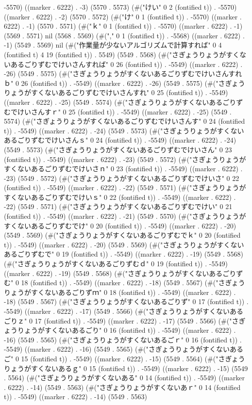 {-5570) ((marker . 6222) . -3) (5570 . 5573) (#("けい" 0 2 (fontified t)) . -5570) ((marker . 6222) . -2) (5570 . 5572) (#("け" 0 1 (fontified t)) . -5570) ((marker . 6222) . -1) (5570 . 5571) (#("ｋ" 0 1 (fontified t)) . -5570) ((marker . 6222) . -1) (5569 . 5571) nil (5568 . 5569) (#("," 0 1 (fontified t)) . -5568) ((marker . 6222) . -1) (5549 . 5569) nil (#("作業量が少ないアルゴリズムで計算すれば" 0 4 (fontified t) 4 19 (fontified t)) . 5549) (5549 . 5568) (#("さぎょうりょうがすくないあるごりずむでけいさんすれば" 0 26 (fontified t)) . -5549) ((marker . 6222) . -26) (5549 . 5575) (#("さぎょうりょうがすくないあるごりずむでけいさんすれｂ" 0 26 (fontified t)) . -5549) ((marker . 6222) . -26) (5549 . 5575) (#("さぎょうりょうがすくないあるごりずむでけいさんすれ" 0 25 (fontified t)) . -5549) ((marker . 6222) . -25) (5549 . 5574) (#("さぎょうりょうがすくないあるごりずむでけいさんすｒ" 0 25 (fontified t)) . -5549) ((marker . 6222) . -25) (5549 . 5574) (#("さぎょうりょうがすくないあるごりずむでけいさんす" 0 24 (fontified t)) . -5549) ((marker . 6222) . -24) (5549 . 5573) (#("さぎょうりょうがすくないあるごりずむでけいさんｓ" 0 24 (fontified t)) . -5549) ((marker . 6222) . -24) (5549 . 5573) (#("さぎょうりょうがすくないあるごりずむでけいさん" 0 23 (fontified t)) . -5549) ((marker . 6222) . -23) (5549 . 5572) (#("さぎょうりょうがすくないあるごりずむでけいさｎ" 0 23 (fontified t)) . -5549) ((marker . 6222) . -23) (5549 . 5572) (#("さぎょうりょうがすくないあるごりずむでけいさ" 0 22 (fontified t)) . -5549) ((marker . 6222) . -22) (5549 . 5571) (#("さぎょうりょうがすくないあるごりずむでけいｓ" 0 22 (fontified t)) . -5549) ((marker . 6222) . -22) (5549 . 5571) (#("さぎょうりょうがすくないあるごりずむでけい" 0 21 (fontified t)) . -5549) ((marker . 6222) . -21) (5549 . 5570) (#("さぎょうりょうがすくないあるごりずむでけ" 0 20 (fontified t)) . -5549) ((marker . 6222) . -20) (5549 . 5569) (#("さぎょうりょうがすくないあるごりずむでｋ" 0 20 (fontified t)) . -5549) ((marker . 6222) . -20) (5549 . 5569) (#("さぎょうりょうがすくないあるごりずむで" 0 19 (fontified t)) . -5549) ((marker . 6222) . -19) (5549 . 5568) (#("さぎょうりょうがすくないあるごりずむｄ" 0 19 (fontified t)) . -5549) ((marker . 6222) . -19) (5549 . 5568) (#("さぎょうりょうがすくないあるごりずむ" 0 18 (fontified t)) . -5549) ((marker . 6222) . -18) (5549 . 5567) (#("さぎょうりょうがすくないあるごりずｍ" 0 18 (fontified t)) . -5549) ((marker . 6222) . -18) (5549 . 5567) (#("さぎょうりょうがすくないあるごりず" 0 17 (fontified t)) . -5549) ((marker . 6222) . -17) (5549 . 5566) (#("さぎょうりょうがすくないあるごりｚ" 0 17 (fontified t)) . -5549) ((marker . 6222) . -17) (5549 . 5566) (#("さぎょうりょうがすくないあるごり" 0 16 (fontified t)) . -5549) ((marker . 6222) . -16) (5549 . 5565) (#("さぎょうりょうがすくないあるごｒ" 0 16 (fontified t)) . -5549) ((marker . 6222) . -16) (5549 . 5565) (#("さぎょうりょうがすくないあるご" 0 15 (fontified t)) . -5549) ((marker . 6222) . -15) (5549 . 5564) (#("さぎょうりょうがすくないあるｇ" 0 15 (fontified t)) . -5549) ((marker . 6222) . -15) (5549 . 5564) (#("さぎょうりょうがすくないある" 0 14 (fontified t)) . -5549) ((marker . 6222) . -14) (5549 . 5563) (#("さぎょうりょうがすくないあｒ" 0 14 (fontified t)) . -5549) ((marker . 6222) . -14) (5549 . 5563) }
